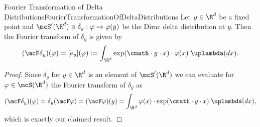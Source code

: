 \begin{mcor}{Fourier Transformation of Delta Distributions}{FourierTransformationOfDeltaDistributions}
    Let $y\in\R^d$ be a fixed point and $\mcS'(\R^d)\ni\delta_y:\varphi\mapsto\varphi(y)$ be the Dirac delta distribution at $y$. Then the Fourier transform of $\delta_y$ is given by
    \[
        (\mcF\delta_y)(\varphi) = [e_y](\varphi) := \int_{\R^d}\exp(\cmath\cdot y\cdot x)\cdot\varphi(x)\;\uplambda(dx).
    \]
\end{mcor}
\begin{proof}
    Since $\delta_y$ for $y\in\R^d$ is an element of $\mcS'(\R^d)$ we can evaluate for $\varphi\in\mcS(\R^d)$ the Fourier transform of $\delta_y$ as
    \[
        (\mcF\delta_y)(\varphi) = \delta_y(\mcF\varphi) = (\mcF\varphi)(y) = \int_{\R^d}\varphi(x)\cdot\exp(\cmath\cdot y\cdot x)\;\uplambdabar(dx),
    \]
    which is exactly our claimed result.
\end{proof}